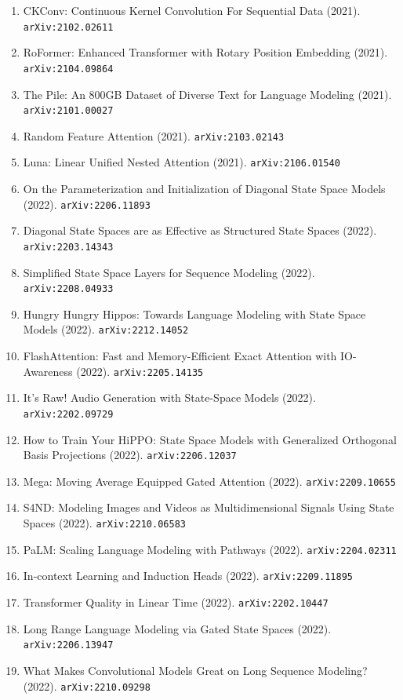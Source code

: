 \documentclass[11pt]{article}
\begin{document}
\begin{enumerate}
  Linear State-Space Layers (2021). \texttt{arXiv:2110.13985}
  \item CKConv: Continuous Kernel Convolution For Sequential Data (2021). \texttt{arXiv:2102.02611}
  \item RoFormer: Enhanced Transformer with Rotary Position Embedding (2021). \texttt{arXiv:2104.09864}
  \item The Pile: An 800GB Dataset of Diverse Text for Language Modeling (2021). \texttt{arXiv:2101.00027}
  \item Random Feature Attention (2021). \texttt{arXiv:2103.02143}
  \item Luna: Linear Unified Nested Attention (2021). \texttt{arXiv:2106.01540}
  \item On the Parameterization and Initialization of Diagonal State Space
  Models (2022). \texttt{arXiv:2206.11893}
  \item Diagonal State Spaces are as Effective as Structured State Spaces (2022). \texttt{arXiv:2203.14343}
  \item Simplified State Space Layers for Sequence Modeling (2022). \texttt{arXiv:2208.04933}
  \item Hungry Hungry Hippos: Towards Language Modeling with State Space Models (2022). \texttt{arXiv:2212.14052}
  \item FlashAttention: Fast and Memory-Efficient Exact Attention with
  IO-Awareness (2022). \texttt{arXiv:2205.14135}
  \item It's Raw! Audio Generation with State-Space Models (2022). \texttt{arXiv:2202.09729}
  \item How to Train Your HiPPO: State Space Models with Generalized Orthogonal
  Basis Projections (2022). \texttt{arXiv:2206.12037}
  \item Mega: Moving Average Equipped Gated Attention (2022). \texttt{arXiv:2209.10655}
  \item S4ND: Modeling Images and Videos as Multidimensional Signals Using State
  Spaces (2022). \texttt{arXiv:2210.06583}
  \item PaLM: Scaling Language Modeling with Pathways (2022). \texttt{arXiv:2204.02311}
  \item In-context Learning and Induction Heads (2022). \texttt{arXiv:2209.11895}
  \item Transformer Quality in Linear Time (2022). \texttt{arXiv:2202.10447}
  \item Long Range Language Modeling via Gated State Spaces (2022). \texttt{arXiv:2206.13947}
  \item What Makes Convolutional Models Great on Long Sequence Modeling? (2022). \texttt{arXiv:2210.09298}

\end{enumerate}
\end{document}
